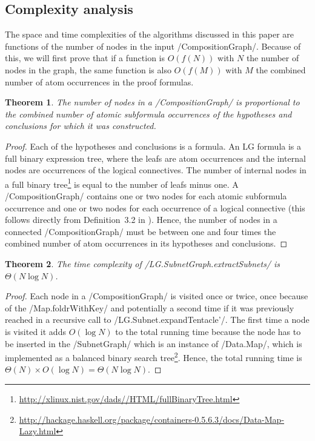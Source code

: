\documentclass[12pt,a4paper]{article}
\newtheorem{theorem}{Theorem}
\begin{document}
\subsection{Complexity analysis}

The space and time complexities of the algorithms discussed in this paper are functions of the number of nodes in the input \hs/CompositionGraph/. Because of this, we will first prove that if a function is $O(f(N))$ with $N$ the number of nodes in the graph, the same function is also $O(f(M))$ with $M$ the combined number of atom occurrences in the proof formulas.
\begin{theorem}\label{thm:nodes}
    The number of nodes in a \hs/CompositionGraph/ is proportional to the combined number of atomic subformula occurrences of the hypotheses and conclusions for which it was constructed.
\end{theorem}
\begin{proof}
    Each of the hypotheses and conclusions is a formula. An LG formula is a full binary expression tree, where the leafs are atom occurrences and the internal nodes are occurrences of the logical connectives. The number of internal nodes in a full binary tree\footnote{\url{http://xlinux.nist.gov/dads//HTML/fullBinaryTree.html}} is equal to the number of leafs minus one. A \hs/CompositionGraph/ contains one or two nodes for each atomic subformula occurrence and one or two nodes for each occurrence of a logical connective (this follows directly from Definition~3.2 in \cite[p.~23]{mm12}). Hence, the number of nodes in a connected \hs/CompositionGraph/ must be between one and four times the combined number of atom occurrences in its hypotheses and conclusions.
\end{proof}

\begin{theorem}\label{thm:netgraph-time}
    The time complexity of \hs/LG.SubnetGraph.extractSubnets/ is $\Theta(N \log N)$.
\end{theorem}
\begin{proof}
    Each node in a \hs/CompositionGraph/ is visited once or twice, once because of the \hs/Map.foldrWithKey/ and potentially a second time if it was previously reached in a recursive call to \hs/LG.Subnet.expandTentacle'/. The first time a node is visited it adds $O(\log N)$ to the total running time because the node has to be inserted in the \hs/SubnetGraph/ which is an instance of \hs/Data.Map/, which is implemented as a balanced binary search tree\footnote{\url{http://hackage.haskell.org/package/containers-0.5.6.3/docs/Data-Map-Lazy.html}}. Hence, the total running time is $\Theta(N)\times O(\log N) = \Theta(N\log N)$.
\end{proof}
\end{document}
